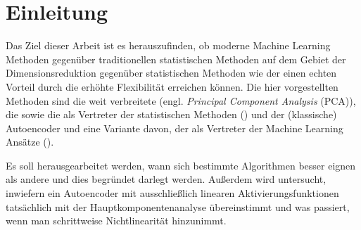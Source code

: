 \chapter{Einleitung}
\label{ch:Enleitung}


Das Ziel dieser Arbeit ist es herauszufinden, ob moderne Machine Learning Methoden gegenüber
traditionellen statistischen Methoden auf dem Gebiet der Dimensionsreduktion gegenüber
statistischen Methoden wie der einen echten Vorteil durch die erhöhte Flexibilität erreichen
können. Die hier vorgestellten Methoden sind die weit verbreitete 
(engl. \textit{Principal Component Analysis} (PCA)), die  sowie die
 als Vertreter der statistischen Methoden
() und der (klassische) Autoencoder und eine Variante
davon, der  als Vertreter der Machine Learning Ansätze
().

Es soll herausgearbeitet werden, wann sich bestimmte Algorithmen besser eignen als andere und dies
begründet darlegt werden. Außerdem wird untersucht, inwiefern ein Autoencoder mit ausschließlich
linearen Aktivierungsfunktionen tatsächlich mit der Hauptkomponentenanalyse übereinstimmt und was
passiert, wenn man schrittweise Nichtlinearität hinzunimmt.

